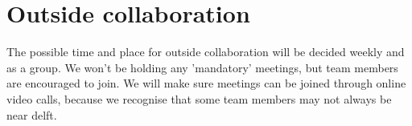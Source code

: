 \section{Outside collaboration}

The possible time and place for outside collaboration will be decided weekly and as a group. We won't be holding any
'mandatory' meetings, but team members are encouraged to join. We will make sure meetings can be joined through online
video calls, because we recognise that some team members may not always be near delft.
